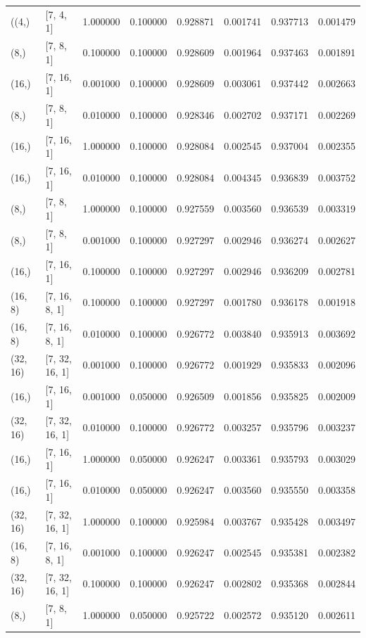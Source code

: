 \documentclass{article}
\begin{document}
\begin{longtable}{llrrrrrr}
\bottomrule
\endlastfoot
((4,) & [7, 4, 1] & 1.000000 & 0.100000 & 0.928871 & 0.001741 & 0.937713 & 0.001479 \\
(8,) & [7, 8, 1] & 0.100000 & 0.100000 & 0.928609 & 0.001964 & 0.937463 & 0.001891 \\
(16,) & [7, 16, 1] & 0.001000 & 0.100000 & 0.928609 & 0.003061 & 0.937442 & 0.002663 \\
(8,) & [7, 8, 1] & 0.010000 & 0.100000 & 0.928346 & 0.002702 & 0.937171 & 0.002269 \\
(16,) & [7, 16, 1] & 1.000000 & 0.100000 & 0.928084 & 0.002545 & 0.937004 & 0.002355 \\
(16,) & [7, 16, 1] & 0.010000 & 0.100000 & 0.928084 & 0.004345 & 0.936839 & 0.003752 \\
(8,) & [7, 8, 1] & 1.000000 & 0.100000 & 0.927559 & 0.003560 & 0.936539 & 0.003319 \\
(8,) & [7, 8, 1] & 0.001000 & 0.100000 & 0.927297 & 0.002946 & 0.936274 & 0.002627 \\
(16,) & [7, 16, 1] & 0.100000 & 0.100000 & 0.927297 & 0.002946 & 0.936209 & 0.002781 \\
(16, 8) & [7, 16, 8, 1] & 0.100000 & 0.100000 & 0.927297 & 0.001780 & 0.936178 & 0.001918 \\
(16, 8) & [7, 16, 8, 1] & 0.010000 & 0.100000 & 0.926772 & 0.003840 & 0.935913 & 0.003692 \\
(32, 16) & [7, 32, 16, 1] & 0.001000 & 0.100000 & 0.926772 & 0.001929 & 0.935833 & 0.002096 \\
(16,) & [7, 16, 1] & 0.001000 & 0.050000 & 0.926509 & 0.001856 & 0.935825 & 0.002009 \\
(32, 16) & [7, 32, 16, 1] & 0.010000 & 0.100000 & 0.926772 & 0.003257 & 0.935796 & 0.003237 \\
(16,) & [7, 16, 1] & 1.000000 & 0.050000 & 0.926247 & 0.003361 & 0.935793 & 0.003029 \\
(16,) & [7, 16, 1] & 0.010000 & 0.050000 & 0.926247 & 0.003560 & 0.935550 & 0.003358 \\
(32, 16) & [7, 32, 16, 1] & 1.000000 & 0.100000 & 0.925984 & 0.003767 & 0.935428 & 0.003497 \\
(16, 8) & [7, 16, 8, 1] & 0.001000 & 0.100000 & 0.926247 & 0.002545 & 0.935381 & 0.002382 \\
(32, 16) & [7, 32, 16, 1] & 0.100000 & 0.100000 & 0.926247 & 0.002802 & 0.935368 & 0.002844 \\
(8,) & [7, 8, 1] & 1.000000 & 0.050000 & 0.925722 & 0.002572 & 0.935120 & 0.002611 \\

\end{longtable}
\end{document}
